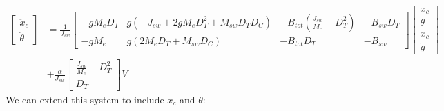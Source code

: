 \documentclass[11pt,a4paper]{article}
\begin{document}
\begin{equation}
	\begin{aligned}
		\begin{bmatrix}
			\ddot{x}_c \\
			\ddot{\theta}
		\end{bmatrix}
		 & =
		\frac{1}{J_{sw}}
		\begin{bmatrix}
			-gM_eD_T & g( -J_{sw} + 2gM_eD_T^2 + M_{sw}D_TD_C) & -B_{tot}(\frac{J_{sw}}{M_e}+D_T^2) & -B_{sw}D_T \\
			-gM_e    & g(2M_eD_T + M_{sw}D_C)                  & -B_{tot}D_T                        & -B_{sw}
		\end{bmatrix}
		\begin{bmatrix}
			x_c       \\
			\theta    \\
			\dot{x}_c \\
			\dot{\theta}
		\end{bmatrix} \\
		 & +
		\frac{\alpha}{J_{sw}}
		\begin{bmatrix}
			\frac{J_{sw}}{M_e} + D_T^2 \\
			D_T
		\end{bmatrix}
		V
	\end{aligned}
\end{equation}
We can extend this system to include $\dot{x}_c$ and $\dot{\theta}$:
\end{document}
